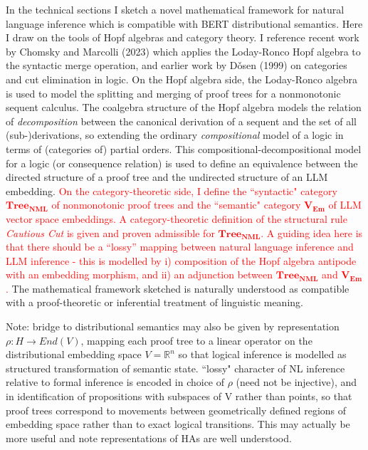 \documentclass[a4paper,11pt]{report}
\begin{document}
In the technical sections I sketch a novel mathematical framework for natural language inference which is compatible with BERT distributional semantics. Here I draw on the tools of Hopf algebras and category theory. I reference recent work by Chomsky and Marcolli (2023) which applies the Loday-Ronco Hopf algebra to the syntactic merge operation, and earlier work by D\v{o}sen (1999) on categories and cut elimination in logic. On the Hopf algebra side, the Loday-Ronco algebra is used to model the splitting and merging of proof trees for a nonmonotonic sequent calculus. The coalgebra structure of the Hopf algebra models the relation of \emph{decomposition} between the canonical derivation of a sequent and the set of all (sub-)derivations, so extending the ordinary \emph{compositional} model of a logic in terms of (categories of) partial orders. This compositional-decompositional model for a logic (or consequence relation) is used to define an equivalence between the directed structure of a proof tree and the undirected structure of an LLM embedding. \textcolor{red}{On the category-theoretic side, I define the ``syntactic" category $\mathbf{Tree_{NML}}$ of nonmonotonic proof trees and the ``semantic" category $\mathbf{V_{Em}}$ of LLM vector space embeddings. A category-theoretic definition of the structural rule \emph{Cautious Cut} is given and proven admissible for $\mathbf{Tree_{NML}}$. A guiding idea here is that there should be a ``lossy'' mapping between natural language inference and LLM inference - this is modelled by i) composition of the Hopf algebra antipode with an embedding morphism, and ii) an adjunction between $\mathbf{Tree_{NML}}$ and $\mathbf{V_{Em}}$.} The mathematical framework sketched is naturally understood as compatible with a proof-theoretic or inferential treatment of linguistic meaning. 


 Note: bridge to distributional semantics may also be given by representation $\rho: H \rightarrow End(V)$, mapping each proof tree to a linear operator on the distributional embedding space $V = \mathbb{R}^n$ so that logical inference is modelled as structured transformation of semantic state. ``lossy" character of NL inference relative to formal inference is encoded in choice of $\rho$ (need not be injective), and in identification of propositions with subspaces of V rather than points, so that proof trees correspond to movements between geometrically defined regions of embedding space rather than to exact logical transitions. This may actually be more useful and note representations of HAs are well understood.
\end{document}
